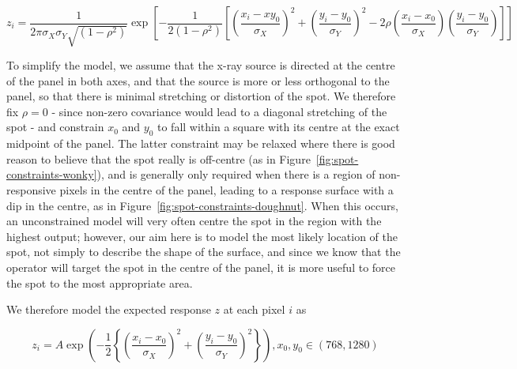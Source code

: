 \documentclass[\main/IO-Pixels.tex]{subfiles}
\begin{document}
\[ z_i = \frac{1}{2\pi \sigma_X \sigma_Y \sqrt{(1-\rho^2)}} \exp \left[ -\frac{1}{2(1-\rho^2)} \left[ \left(\frac{x_i-xy_0}{\sigma_X}\right)^2 + \left(\frac{y_i-y_0}{\sigma_Y}\right)^2 - 2\rho\left(\frac{x_i-x_0}{\sigma_X} \right) \left(\frac{y_i-y_0}{\sigma_Y} \right) \right] \right] \]

To simplify the model, we assume that the x-ray source is directed at the centre of the panel in both axes, and that the source is more or less orthogonal to the panel, so that there is minimal stretching or distortion of the spot. We therefore fix $\rho = 0$ - since non-zero covariance would lead to a diagonal stretching of the spot - and constrain $x_0$ and $y_0$ to fall within a square with its centre at the exact midpoint of the panel. The latter constraint may be relaxed where there is good reason to believe that the spot really is off-centre (as in Figure~\ref{fig:spot-constraints-wonky}), and is generally only required when there is a region of non-responsive pixels in the centre of the panel, leading to a response surface with a dip in the centre, as in Figure~\ref{fig:spot-constraints-doughnut}. When this occurs, an unconstrained model will very often centre the spot in the region with the highest output; however, our aim here is to model the most likely location of the spot, not simply to describe the shape of the surface, and since we know that the operator will target the spot in the centre of the panel, it is more useful to force the spot to the most appropriate area. 

We therefore model the expected response $z$ at each pixel $i$ as

\[ z_i = A \exp \left(-\frac{1}{2} \left\lbrace \left(\frac{x_i - x_0}{\sigma_X}\right)^2 + \left(\frac{y_i - y_0}{\sigma_Y}\right)^2 \right\rbrace \right) , x_0, y_0 \in (768, 1280) \]
\end{document}
